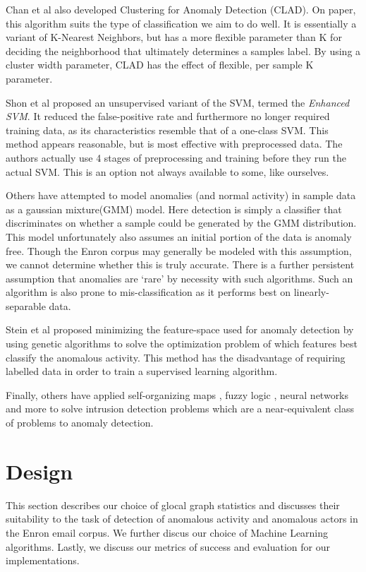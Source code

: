 \documentclass[11pt,letterpaper]{article}
\begin{document}
Chan et al \cite{chan2003machine} also developed Clustering for Anomaly Detection (CLAD).
On paper, this algorithm suits the type of classification we aim to do well. It is
essentially a variant of K-Nearest Neighbors, but has a more flexible parameter than K
for deciding the neighborhood that ultimately determines a samples label. By using a 
cluster width parameter, CLAD has the effect of flexible, per sample K parameter.

Shon et al \cite{shon2007hybrid} proposed an unsupervised variant of the SVM, termed
the \textit{Enhanced SVM}. It reduced the false-positive rate and furthermore no longer required 
training data, as its characteristics resemble that of a one-class SVM. This method appears
reasonable, but is most effective with preprocessed data. The authors actually use 4 stages of
preprocessing and training before they run the actual SVM. This is an option not always available
to some, like ourselves.

Others \cite{eskin2000anomaly} have attempted to model anomalies (and normal activity)
in sample data as a gaussian mixture(GMM) model. Here detection is simply a classifier that
discriminates on whether a sample could be generated by the GMM distribution.
This model unfortunately also assumes an initial portion of the data is anomaly free.
Though the Enron corpus may generally be modeled with this assumption, we cannot
determine whether this is truly accurate. There is a further persistent assumption
that anomalies are `rare' by necessity with such algorithms. Such an algorithm is also
prone to mis-classification as it performs best on linearly-separable data.

Stein et al \cite{stein2005decision} proposed minimizing the feature-space used for 
anomaly detection by using genetic algorithms to solve the optimization problem of which
features best classify the anomalous activity. This method has the disadvantage of requiring
labelled data in order to train a supervised learning algorithm.

Finally, others have applied self-organizing maps \cite{rhodes2000multiple}, fuzzy logic \cite{zimmermann1992fuzzy}, neural networks \cite{mukkamala2002intrusion} and more to 
solve intrusion detection problems which are a near-equivalent class of problems to anomaly detection.

\section{Design}
This section describes our choice of glocal graph statistics and discusses their suitability
to the task of detection of anomalous activity and anomalous actors in the Enron email corpus.
We further discus our choice of Machine Learning algorithms. Lastly, we discuss our metrics
of success and evaluation for our implementations.
\end{document}

